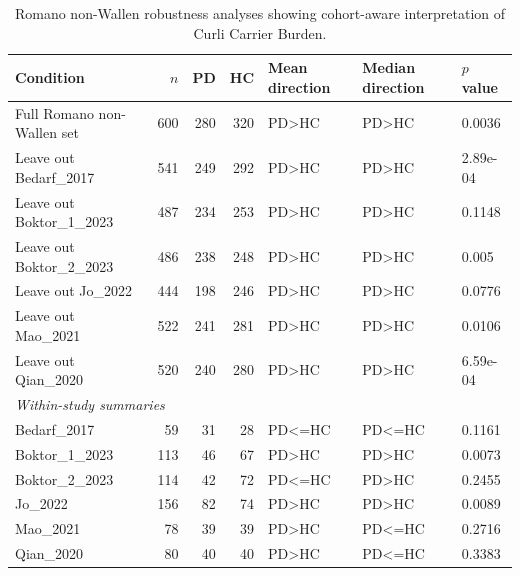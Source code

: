 \begin{table}[htbp]
\centering
\caption{Romano non-Wallen robustness analyses showing cohort-aware interpretation of Curli Carrier Burden.}
\label{tab:romano-robustness}
\small
\begin{tabular}{lrrrlll}
\hline
Condition & $n$ & PD & HC & Mean direction & Median direction & $p$ value \\
\hline
Full Romano non-Wallen set & 600 & 280 & 320 & PD>HC & PD>HC & 0.0036 \\
Leave out Bedarf\_2017 & 541 & 249 & 292 & PD>HC & PD>HC & 2.89e-04 \\
Leave out Boktor\_1\_2023 & 487 & 234 & 253 & PD>HC & PD>HC & 0.1148 \\
Leave out Boktor\_2\_2023 & 486 & 238 & 248 & PD>HC & PD>HC & 0.005 \\
Leave out Jo\_2022 & 444 & 198 & 246 & PD>HC & PD>HC & 0.0776 \\
Leave out Mao\_2021 & 522 & 241 & 281 & PD>HC & PD>HC & 0.0106 \\
Leave out Qian\_2020 & 520 & 240 & 280 & PD>HC & PD>HC & 6.59e-04 \\
\hline
\multicolumn{7}{l}{\textit{Within-study summaries}} \\
\hline
Bedarf\_2017 & 59 & 31 & 28 & PD<=HC & PD<=HC & 0.1161 \\
Boktor\_1\_2023 & 113 & 46 & 67 & PD>HC & PD>HC & 0.0073 \\
Boktor\_2\_2023 & 114 & 42 & 72 & PD<=HC & PD>HC & 0.2455 \\
Jo\_2022 & 156 & 82 & 74 & PD>HC & PD>HC & 0.0089 \\
Mao\_2021 & 78 & 39 & 39 & PD>HC & PD<=HC & 0.2716 \\
Qian\_2020 & 80 & 40 & 40 & PD>HC & PD<=HC & 0.3383 \\
\hline
\end{tabular}
\end{table}
